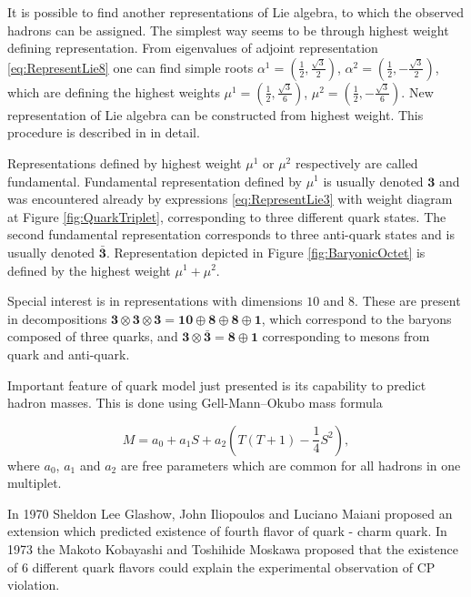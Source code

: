 It is possible to find another representations of Lie algebra, to which the
observed hadrons can be assigned. The simplest way seems to be through highest
weight defining representation. From eigenvalues of adjoint representation
\eqref{eq:RepresentLie8} one can find simple roots 
$\alpha^1=\left( \frac{1}{2}, \frac{\sqrt{3}}{2} \right)$, 
$\alpha^2=\left( \frac{1}{2}, - \frac{\sqrt{3}}{2} \right)$, 
which are defining the highest weights 
$\mu^1=\left( \frac{1}{2}, \frac{\sqrt{3}}{6} \right)$, 
$\mu^2=\left( \frac{1}{2}, - \frac{\sqrt{3}}{6} \right)$.
New representation of Lie algebra can be constructed from highest weight. This
procedure is described in \cite{LieAlgebrasForParticlePhysicists} in detail.

Representations defined by highest weight $\mu^1$ or $\mu^2$ respectively are
called fundamental. Fundamental representation defined by $\mu^1$ is usually
denoted $\mathbf{3}$ and was encountered already by expressions
\eqref{eq:RepresentLie3} with weight diagram at Figure \ref{fig:QuarkTriplet},
corresponding to three different quark states. The second fundamental
representation corresponds to three anti-quark states and is usually denoted
$\bar{\mathbf{3}}$. Representation depicted in Figure \ref{fig:BaryonicOctet} is
defined by the highest weight $\mu^1 + \mu^2$.

Special interest is in representations with dimensions $10$ and $8$. These
are present in decompositions $\mathbf{3} \otimes \mathbf{3} \otimes
\mathbf{3} = \mathbf{10} \oplus \mathbf{8} \oplus \mathbf{8} \oplus \mathbf{1}$,
which correspond to the baryons composed of three quarks, and $\mathbf{3}
\otimes \bar{\mathbf{3}} = \mathbf{8} \oplus \mathbf{1}$ corresponding to
mesons from quark and anti-quark.

Important feature of quark model just presented is its capability to predict
hadron masses. This is done using Gell-Mann--Okubo mass formula
\cite{Gell-Mann:1250016,Okubo01051962}

\begin{equation}
  M = a_0 + a_1 S + a_2 \left( T(T+1) - \frac{1}{4}S^2 \right),
  \label{eq:GellMannOkubo}
\end{equation}
where $a_0$, $a_1$ and $a_2$ are free parameters which are common for all
hadrons in one multiplet. 

In 1970 Sheldon Lee Glashow, John Iliopoulos and Luciano Maiani proposed
\cite{Quarks4} an extension which predicted existence of fourth flavor of quark
- charm quark.
In 1973 the Makoto Kobayashi and Toshihide Moskawa proposed \cite{Quarks6} that the
existence of 6 different quark flavors could explain the experimental
observation of CP violation.


